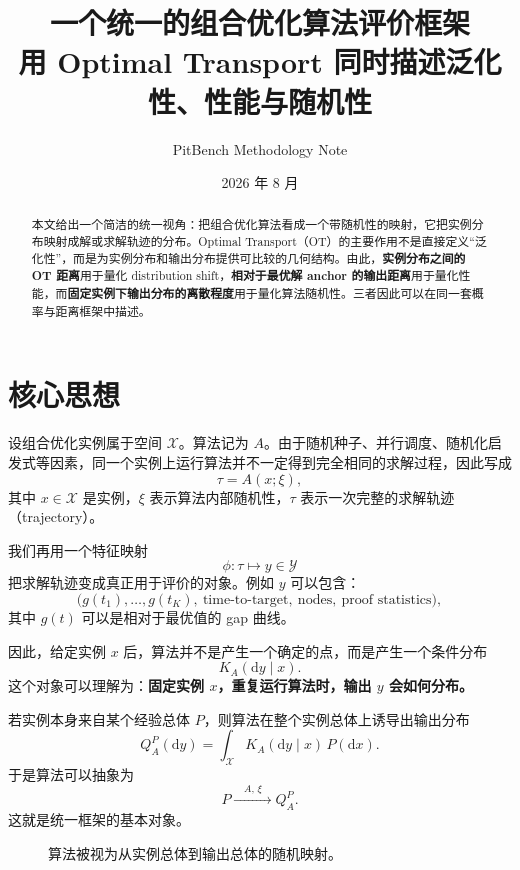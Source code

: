 \documentclass[11pt,a4paper]{ctexart}
\title{\textbf{一个统一的组合优化算法评价框架}\\[0.35em]
\large 用 Optimal Transport 同时描述泛化性、性能与随机性}
\author{PitBench Methodology Note}
\date{2026 年 8 月}
\begin{document}
\maketitle

\begin{abstract}
本文给出一个简洁的统一视角：把组合优化算法看成一个带随机性的映射，它把实例分布映射成解或求解轨迹的分布。Optimal Transport（OT）的主要作用不是直接定义“泛化性”，而是为实例分布和输出分布提供可比较的几何结构。由此，\textbf{实例分布之间的 OT 距离}用于量化 distribution shift，\textbf{相对于最优解 anchor 的输出距离}用于量化性能，而\textbf{固定实例下输出分布的离散程度}用于量化算法随机性。三者因此可以在同一套概率与距离框架中描述。
\end{abstract}

\section{核心思想}

设组合优化实例属于空间 $\mathcal X$。算法记为 $A$。由于随机种子、并行调度、随机化启发式等因素，同一个实例上运行算法并不一定得到完全相同的求解过程，因此写成
\[
\tau = A(x;\xi),
\]
其中 $x\in\mathcal X$ 是实例，$\xi$ 表示算法内部随机性，$\tau$ 表示一次完整的求解轨迹（trajectory）。

我们再用一个特征映射
\[
\phi:\tau\mapsto y\in\mathcal Y
\]
把求解轨迹变成真正用于评价的对象。例如 $y$ 可以包含：
\[
\bigl(g(t_1),\ldots,g(t_K),\ \text{time-to-target},\ \text{nodes},\ \text{proof statistics}\bigr),
\]
其中 $g(t)$ 可以是相对于最优值的 gap 曲线。

因此，给定实例 $x$ 后，算法并不是产生一个确定的点，而是产生一个条件分布
\[
K_A(\mathrm dy\mid x).
\]
这个对象可以理解为：\textbf{固定实例 $x$，重复运行算法时，输出 $y$ 会如何分布。}

若实例本身来自某个经验总体 $P$，则算法在整个实例总体上诱导出输出分布
\[
Q_A^P(\mathrm dy)
=
\int_{\mathcal X} K_A(\mathrm dy\mid x)\,P(\mathrm dx).
\]
于是算法可以抽象为
\[
\boxed{P\xrightarrow{\quad A,\,\xi\quad}Q_A^P.}
\]
这就是统一框架的基本对象。

\begin{figure}[htbp]
\centering
{}
\caption{算法被视为从实例总体到输出总体的随机映射。}
\end{figure}
\end{document}
